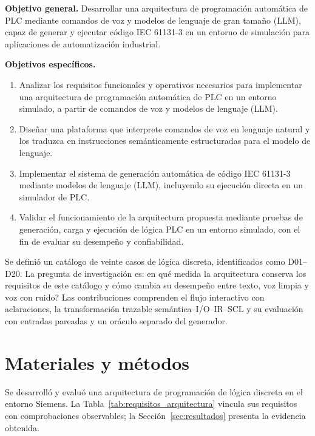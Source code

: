 \documentclass[a4paper,fleqn]{cas-dc}
\newcommand{\TituloMetodos}{Materiales y métodos}
\newcommand{\TituloMetodos}{Materials and Methods}
\begin{document}
\textbf{Objetivo general.} Desarrollar una arquitectura de programación automática de PLC mediante comandos de voz y modelos de lenguaje de gran tamaño (LLM), capaz de generar y ejecutar código IEC 61131-3 en un entorno de simulación para aplicaciones de automatización industrial.

\textbf{Objetivos específicos.}
\begin{enumerate}
\item Analizar los requisitos funcionales y operativos necesarios para implementar una arquitectura de programación automática de PLC en un entorno simulado, a partir de comandos de voz y modelos de lenguaje (LLM).
\item Diseñar una plataforma que interprete comandos de voz en lenguaje natural y los traduzca en instrucciones semánticamente estructuradas para el modelo de lenguaje.
\item Implementar el sistema de generación automática de código IEC 61131-3 mediante modelos de lenguaje (LLM), incluyendo su ejecución directa en un simulador de PLC.
\item Validar el funcionamiento de la arquitectura propuesta mediante pruebas de generación, carga y ejecución de lógica PLC en un entorno simulado, con el fin de evaluar su desempeño y confiabilidad.
\end{enumerate}

Se definió un catálogo de veinte casos de lógica discreta, identificados como D01--D20. La pregunta de investigación es: \textquestiondown{}en qué medida la arquitectura conserva los requisitos de este catálogo y cómo cambia su desempeño entre texto, voz limpia y voz con ruido? Las contribuciones comprenden el flujo interactivo con aclaraciones, la transformación trazable semántica--I/O--IR--SCL y su evaluación con entradas pareadas y un oráculo separado del generador.


\section{\TituloMetodos}
\label{sec:metodos}
Se desarrolló y evaluó una arquitectura de programación de lógica discreta en el entorno Siemens. La Tabla~\ref{tab:requisitos_arquitectura} vincula sus requisitos con comprobaciones observables; la Sección~\ref{sec:resultados} presenta la evidencia obtenida.
\end{document}
